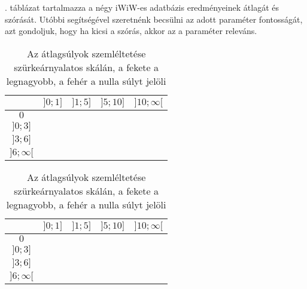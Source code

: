 \documentclass[12pt]{article}
\begin{document}
. táblázat tartalmazza a négy iWiW-es adatbázis eredményeinek átlagát és szórását. Utóbbi segítségével szeretnénk becsülni az adott paraméter fontosságát, azt gondoljuk, hogy ha kicsi a szórás, akkor az a paraméter releváns.
\begin{table}[H]
	\centering
	\begin{subtable}{0.49\linewidth}
		\centering
		\captionsetup{justification=centering}
		\begin{tabular}{|c|c|c|c|c|}
			\hline
			\diagbox[width=1.5cm,height=1.2cm]{$\sigma_{cs}$}{$n_{cs}$} & $]0;1]$ & $]1;5]$ & $]5;10]$ & $]10;\infty[$  \\
			\hline
			$0$ & \cellcolor{black!2.29197724866} & \multicolumn{3}{|c|}{\cellcolor{black!61.6417959552}} \\
			\hline
			$]0;3]$ & \multicolumn{2}{|c|}{\cellcolor{black!32.1530429639}} & \cellcolor{black!100.0} & \cellcolor{black!74.7656558385} \\
			\hline
			$]3;6]$ & \multicolumn{2}{|c|}{\cellcolor{black!7.31710097424}} & \cellcolor{black!14.5082036667} & \cellcolor{black!61.1413096658} \\
			\hline
			$]6;\infty[$  & \multicolumn{2}{|c|}{\cellcolor{black!13.8980750161}} & \cellcolor{black!7.25697267743} & \cellcolor{black!2.50153620463} \\
			\hline
		\end{tabular}
		\caption{Átlagolt eredmény iWiW-es adatok}
	\end{subtable}
	\begin{subtable}{0.49\linewidth}
		\centering
		\captionsetup{justification=centering}
		\begin{tabular}{|c|c|c|c|c|}
			\hline
			\diagbox[width=1.5cm,height=1.2cm]{$\sigma_{cs}$}{$n_{cs}$} & $]0;1]$ & $]1;5]$ & $]5;10]$ & $]10;\infty[$  \\
			\hline
			$0$ & \cellcolor{black!41.6260287747} & \multicolumn{3}{|c|}{\cellcolor{black!100.0}} \\
			\hline
			$]0;3]$ & \multicolumn{2}{|c|}{\cellcolor{black!79.4296340811}} & \cellcolor{black!43.3702665881} & \cellcolor{black!72.2570330425} \\
			\hline
			$]3;6]$ & \multicolumn{2}{|c|}{\cellcolor{black!41.2383548732}} & \cellcolor{black!73.260837667} & \cellcolor{black!13.1102073008} \\
			\hline
			$]6;\infty[$  & \multicolumn{2}{|c|}{\cellcolor{black!0.0}} & \cellcolor{black!14.8125274065} & \cellcolor{black!0.0} \\
			\hline
		\end{tabular}
		\caption{Telefonos adatok 60-69}
	\end{subtable}
	\caption{Az átlagsúlyok szemléltetése szürkeárnyalatos skálán, a fekete a legnagyobb, a fehér a nulla súlyt jelöli}
	\label{suly_szemleltetes}
\end{table}
\end{document}
